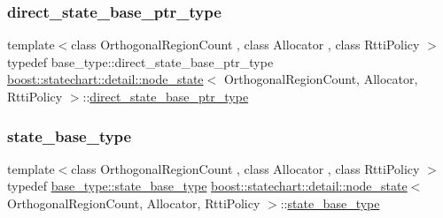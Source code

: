 \mbox{\label{classboost_1_1statechart_1_1detail_1_1node__state_aa558d33fc74e9580389232c0b7dc7e92}} 
\subsubsection{\texorpdfstring{direct\+\_\+state\+\_\+base\+\_\+ptr\+\_\+type}{direct\_state\_base\_ptr\_type}}
{\footnotesize\ttfamily template$<$class Orthogonal\+Region\+Count , class Allocator , class Rtti\+Policy $>$ \\
typedef base\+\_\+type\+::direct\+\_\+state\+\_\+base\+\_\+ptr\+\_\+type \mbox{\hyperlink{classboost_1_1statechart_1_1detail_1_1node__state}{boost\+::statechart\+::detail\+::node\+\_\+state}}$<$ Orthogonal\+Region\+Count, Allocator, Rtti\+Policy $>$\+::\mbox{\hyperlink{classboost_1_1statechart_1_1detail_1_1node__state__base_a52fa5db06246a5d37b5980aa378fa41c}{direct\+\_\+state\+\_\+base\+\_\+ptr\+\_\+type}}}

\mbox{\label{classboost_1_1statechart_1_1detail_1_1node__state_a0687cb4eadba3b2feb66322c6b57475b}} 
\subsubsection{\texorpdfstring{state\+\_\+base\+\_\+type}{state\_base\_type}}
{\footnotesize\ttfamily template$<$class Orthogonal\+Region\+Count , class Allocator , class Rtti\+Policy $>$ \\
typedef \mbox{\hyperlink{classboost_1_1statechart_1_1detail_1_1node__state__base_a2b7ddb7642a5452045d9448444426735}{base\+\_\+type\+::state\+\_\+base\+\_\+type}} \mbox{\hyperlink{classboost_1_1statechart_1_1detail_1_1node__state}{boost\+::statechart\+::detail\+::node\+\_\+state}}$<$ Orthogonal\+Region\+Count, Allocator, Rtti\+Policy $>$\+::\mbox{\hyperlink{classboost_1_1statechart_1_1detail_1_1node__state__base_a2b7ddb7642a5452045d9448444426735}{state\+\_\+base\+\_\+type}}}



